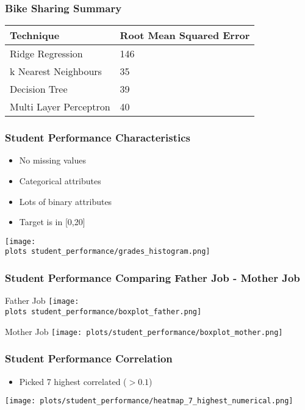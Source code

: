 \documentclass[aspectratio=169]{beamer}
\def \plots {./plots/}
\begin{document}
\begin{frame}{}
\frametitle{Bike Sharing Summary}
\begin{table}[]
\begin{tabular}{ll}
\hline
\textbf{Technique}     & \textbf{Root Mean Squared Error} \\ \hline
Ridge Regression       &                  146                \\
k Nearest Neighbours   &                  35                \\
Decision Tree          &                39                  \\
Multi Layer Perceptron &              40                    \\ \hline
\end{tabular}
\end{table}
\end{frame}

\begin{frame}{}
\frametitle{Student Performance Characteristics}
\begin{minipage}{0.45\textwidth}
\begin{itemize}
\item No missing values
\item Categorical attributes
\item Lots of binary attributes
\item Target is in [0,20]
\end{itemize}
\end{minipage}
\begin{minipage}{0.5\textwidth}
    \texttt{[image: \\plots student\_performance/grades\_histogram.png]}
\end{minipage}
\end{frame}

\begin{frame}{}
\frametitle{Student Performance Comparing Father Job - Mother Job}
\begin{minipage}{0.49\textwidth}
	\center Father Job
    \texttt{[image: \\plots student\_performance/boxplot\_father.png]}
\end{minipage}
\begin{minipage}{0.49\textwidth}
	\center Mother Job
    \texttt{[image: plots/student\_performance/boxplot\_mother.png]}
\end{minipage}
\end{frame}

\begin{frame}{}
\frametitle{Student Performance Correlation}
\begin{minipage}{0.3\textwidth}
\begin{itemize}
\item Picked 7 highest correlated ($> 0.1$)
\end{itemize}
\end{minipage}
\begin{minipage}{0.69\textwidth}
    \texttt{[image: plots/student\_performance/heatmap\_7\_highest\_numerical.png]}
\end{minipage}
\end{frame}
\end{document}
